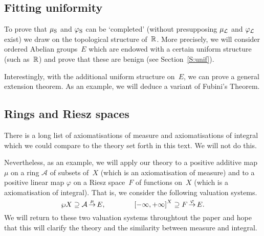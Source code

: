\documentclass[main.tex]{subfiles}
\begin{document}
\subsection{Fitting uniformity}
To prove that $\mu_{\mathrm{S}}$ and $\varphi_{\mathrm{S}}$
can be `completed'
(without presupposing $\mu_{\mathcal{L}}$ and $\varphi_{\mathcal{L}}$ exist)
we draw on the topological structure of~$\mathbb{R}$.
More precisely,
we will consider ordered Abelian groups~$E$
which are endowed with a certain uniform structure
(such as~$\mathbb{R}$) and prove
that these are benign (see Section~\ref{S:unif}).

Interestingly,
with the additional uniform structure on~$E$,
we can prove a general extension theorem. 
As an example,
we will deduce a variant of Fubini's Theorem.

\subsection{Rings and Riesz spaces}
There is a long list of axiomatisations of measure and
axiomatisations of integral
which we could compare to the theory set forth in this text.
We will not do this.

Nevertheless,
as an example,
we will apply our theory
to a positive additive map $\mu$ on a ring $\mathcal{A}$ of
subsets of~$X$
(which is an axiomatisation of measure)
and 
to a positive linear 
map $\varphi$ on a Riesz space~$F$ of functions on~$X$
(which is a axiomatisation of integral).
That is,
we consider the following valuation systems.
\begin{equation*}
\wp X \supseteq \mathcal{A}\,\smash{\stackrel{\mu}{\rightarrow}}\,E,
\qquad\qquad
\smash{{[-\infty,+\infty]}^X} \supseteq F\,\smash{\stackrel{\varphi}{\rightarrow}}\,E.
\end{equation*}
We will return to these two valuation systems throughtout the paper
and hope that this will clarify the theory
and the similarity between measure and integral.
\end{document}
